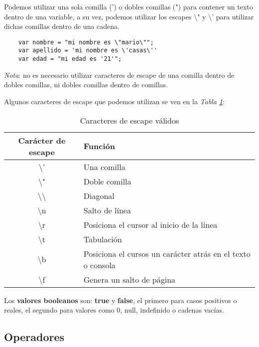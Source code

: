 Podemos utilizar una sola comilla (') o dobles comillas (") para contener un texto dentro de una variable, a su vez, podemos utilizar los escapes \textbackslash " y \textbackslash ' para utilizar dichas comillas dentro de una cadena.
\begin{lstlisting}
    var nombre = "mi nombre es \"mario\"";
    var apellido = 'mi nombre es \'casas\''
    var edad = "mi edad es '21'";
\end{lstlisting}

\textit{Nota}: no es necesario utilizar caracteres de escape de una comilla dentro de dobles comillas, ni dobles comillas dentro de comillas.

Algunos caracteres de escape que podemos utilizan se ven en la \textit{Tabla \ref{tab: 1}}:
\begin{table}[H]
    \begin{center}
        \caption{Caracteres de escape válidos}
        \label{tab: 1}
        \begin{tabular}{c l}
            \hline
            \textbf{Carácter de escape}&\textbf{Función} \\
            \hline
            \textbackslash ' & Una comilla \\
            \textbackslash " & Doble comilla \\
            \textbackslash \textbackslash & Diagonal \\
            \textbackslash n & Salto de línea \\
            \textbackslash r & Posiciona el cursor al inicio de la línea \\
            \textbackslash t & Tabulación \\
            \textbackslash b & Posiciona el cursos un carácter atrás en el texto o consola \\
            \textbackslash f & Genera un salto de página \\
            \hline
        \end{tabular}
    \end{center}
\end{table}

Los \textbf{valores booleanos} son: \textbf{true} y \textbf{false}, el primero para casos positivos o reales, el segundo para valores como 0, null, indefinido o cadenas vacías.


\subsection{Operadores}


